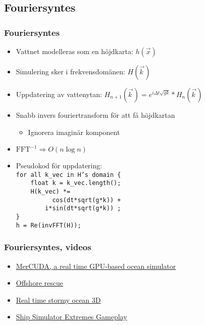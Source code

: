 \subsection{Fouriersyntes}

\begin{frame}
\frametitle{Fouriersyntes}

\begin{itemize}[<+(1)->]
\item Vattnet modelleras som en höjdkarta: $h(\vec{x})$
\item Simulering sker i frekvensdomänen: $H(\vec{k\,})$
\item Uppdatering av vattenytan: $\displaystyle H_{n+1}(\vec{k\,}) = e^{i\Delta t\sqrt{gk}}*H_{n}(\vec{k\,})$
\item Snabb invers fouriertransform för att få höjdkartan 
    \begin{itemize}[<+(1)->]
    \item Ignorera imaginär komponent
    \end{itemize}
\item $\text{FFT}^{-1} \Rightarrow O(n \log n)$
\item Pseudokod för uppdatering: \texttt{\\
for all k\_vec in H's domain \{         \\
\ \ \ \ float k = k\_vec.length();      \\
\ \ \ \ H(k\_vec) *=                    \\
\ \ \ \ \ \ \ \ \ \ cos(dt*sqrt(g*k)) + \\
\ \ \ \ \ \ \ \   i*sin(dt*sqrt(g*k)) ; \\
\}                                      \\
h = Re(invFFT(H));                      \\
}
\end{itemize}

\end{frame}

\begin{frame}
\frametitle{Fouriersyntes, videos}

\begin{itemize}
\item \href{http://www.youtube.com/watch?v=sf6EVn2Zgk4}{MerCUDA, a real time GPU-based ocean simulator}
\item \href{http://www.youtube.com/watch?v=Lj_V5-bTvK0}{Offshore rescue}
\item \href{http://www.youtube.com/watch?v=3YW9WFwD-rI}{Real time stormy ocean 3D}
\item \href{http://www.youtube.com/watch?v=ocHyTiHEphg}{Ship Simulator Extremes Gameplay}
\end{itemize}

\end{frame}